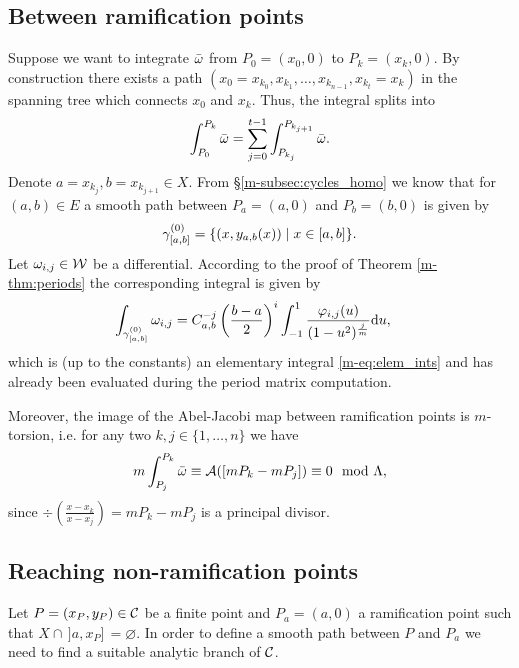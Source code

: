 \documentclass[main.tex]{subfiles}
\begin{document}
  \subsection{Between ramification points}\label{subsec:ajm_ram_pts}

  Suppose we want to integrate $\bar{\omega}$ from $P_0 =(x_0,0)$ to $P_k = (x_k,0)$. By construction there exists a path
 $(x_0=x_{k_0},x_{k_1},\dots,x_{k_{n-1}},x_{k_t}=x_k)$ in the spanning tree which connects $x_0$ and $x_k$. Thus, the integral splits into
  \begin{align*}
    \int_{P_0}^{P_k} \bar{\omega} = \sum_{j = 0}^{t-1}  \int_{P_{k_j}}^{P_{k_{j+1}}} \bar{\omega}.
  \end{align*}
  Denote $a = x_{k_j}, b = x_{k_{j+1}} \in X$. From \S \ref{m-subsec:cycles_homo} we know that for $(a,b) \in E$ a smooth path between $P_a=(a,0)$ and $P_b=(b,0)$ is given by
  \begin{align*}
   \gamma_{[a,b]}^{(0)} = \{  (x,y_{a,b}(x))  \mid  x \in [a,b]  \}.
  \end{align*}
  Let $\omega_{i,j} \in \mathcal{W}$ be a differential. According to the proof of Theorem \ref{m-thm:periods} the corresponding integral is given by
  \begin{align*}
   \int_{\gamma_{[a,b]}^{(0)}} \omega_{i,j}  & =
   C_{a,b}^{-j} \left(\frac{b-a}{2}\right)^i \int_{-1}^1 \frac{\varphi_{i,j}(u)}{(1-u^2)^{\frac{j}{m}}}  \mathrm d u,
  \end{align*}
  which is (up to the constants) an elementary integral \eqref{m-eq:elem_ints}
  and has already been evaluated during the period matrix computation.

  \begin{rmk}
  Moreover, the image of the Abel-Jacobi map between ramification points is $m$-torsion, i.e. for any two $k,j \in \{1,\dots,n\}$ we have
  \begin{equation}\label{eq:m_tors}
    m \int_{P_j}^{P_k} \bar{\omega} \equiv \mathcal{A}( [ mP_k - mP_j ] ) \equiv 0 \mod  \Lambda,
  \end{equation}
  since $\div\left( \frac{x-x_k}{x-x_j} \right) = mP_k - mP_j$ is a principal divisor.
  \end{rmk}

  \subsection{Reaching non-ramification points}\label{subsec:ajm_finite}

  Let $P = (x_P,y_P) \in \mathcal{C}$ be a finite point and $P_a = (a,0)$ a ramification point such that $X\cap\,]a,x_P]\,=\varnothing$. In order to define a smooth path between $P$ and $P_a$
  we need to find a suitable analytic branch of $\mathcal{C}$.
\end{document}

